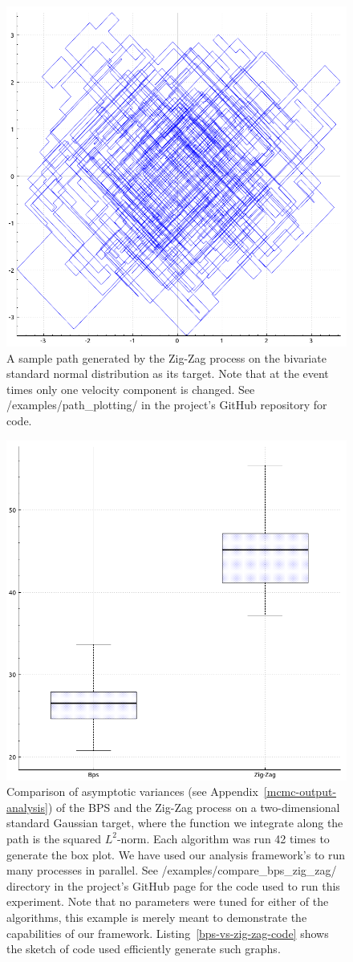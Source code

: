 \documentclass[report.tex]{subfiles}
\begin{document}
\begin{figure}
  \centering
  \includegraphics[width=.45\textwidth]{img/zig_zag_path}
  \caption{A sample path generated by the Zig-Zag process on the bivariate
     standard normal distribution as its target.
     Note that at the event times only one velocity component is changed.
     See /examples/path\_plotting/ in the project's GitHub repository for code.}
  \label{zig-zag-path}
\end{figure}

\begin{figure}
  \centering
  \includegraphics[width=.45\textwidth]{img/asymptotic_var}
  \caption{Comparison of asymptotic variances (see Appendix~\ref{mcmc-output-analysis})
           of the BPS and the Zig-Zag process on a two-dimensional standard Gaussian target, where
           the function we integrate along the path is the squared $L^{2}$-norm.
           Each algorithm was run 42 times to generate the box plot.
           We have used our analysis framework's to run many processes in parallel.
           See /examples/compare\_bps\_zig\_zag/ directory in the project's GitHub page
           for the code used to run this experiment. Note that no parameters were tuned
           for either of the algorithms, this example is merely meant to demonstrate
           the capabilities of our framework. Listing~\ref{bps-vs-zig-zag-code} shows the
           sketch of code used efficiently generate such graphs.}
  \label{zig-zag-vs-bps}
\end{figure}
\end{document}

